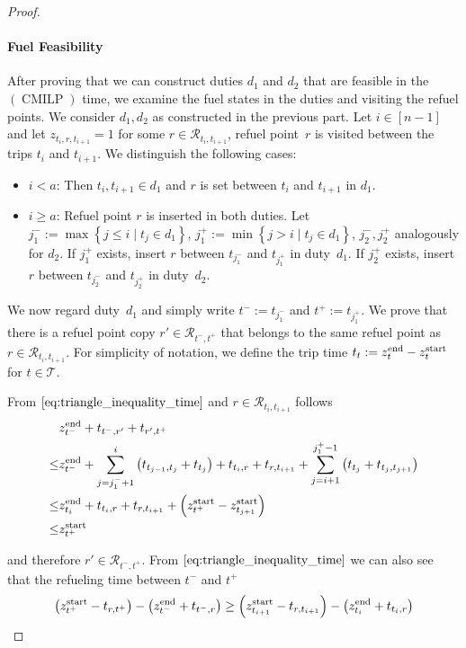 \begin{proof}
\paragraph{Fuel Feasibility} \proofparfill

After proving that we can construct duties $d_1$ and $d_2$ that are feasible in the $(\operatorname{CMILP})$ \wrt time, we examine the fuel states in the duties and visiting the refuel points. We consider $d_1,d_2$ as constructed in the previous part. Let $i\in[n-1]$ and let ${z_{t_i,r,t_{i+1}}=1}$ for some ${r\in\mathcal{R}_{t_i,t_{i+1}}}$, \ie refuel point~$r$ is visited between the trips $t_i$ and $t_{i+1}$. We distinguish the following cases:
\begin{itemize}
	\item{$i<a$:}
		Then ${t_i,t_{i+1}\in d_1}$ and $r$ is set between $t_i$ and $t_{i+1}$ in $d_1$.
	\item{$i\geq a$:}
		Refuel point $r$ is inserted in both duties. Let ${j^-_1:=\max\left\{j\leq i\mid t_j\in d_1\right\}}$, ${j^+_1:=\min\left\{j>i\mid t_j\in d_1\right\}}$, $j^-_2,j^+_2$ analogously for $d_2$. If $j^+_1$ exists, insert $r$ between $t_{j^-_1}$ and $t_{j^+_1}$ in duty~$d_1$. If $j^+_2$ exists, insert $r$ between $t_{j^-_2}$ and $t_{j^+_2}$ in duty~$d_2$.
\end{itemize}

We now regard duty~$d_1$ and simply write ${t^-:=t_{j^-_1}}$ and ${t^+:=t_{j^+_1}}$. We prove that there is a refuel point copy ${r'\in\mathcal{R}_{t^-,t^+}}$ that belongs to the same refuel point as ${r\in\mathcal{R}_{t_i,t_{i+1}}}$. For simplicity of notation, we define the trip time ${t_t := z^{\operatorname{end}}_{t} - z^{\operatorname{start}}_{t}}$ for ${t\in\mathcal{T}}$.

From $\eqref{eq:triangle_inequality_time}$ and ${r\in\mathcal{R}_{t_i,t_{i+1}}}$ follows
\begin{align*}
	& z^{\operatorname{end}}_{t^-} + t_{t^-,r'} + t_{r',t^+} \\
	\leq & z^{\operatorname{end}}_{t^-} + \sum_{j=j^-_1+1}^i \left(t_{t_{j-1},t_{j}} + t_{t_j}\right) + t_{t_i,r} + t_{r,t_{i+1}} + \sum_{j=i+1}^{j^+_1-1} \left(t_{t_j} + t_{t_{j},t_{j+1}}\right) \\
	\leq & z^{\operatorname{end}}_{t_i} + t_{t_i,r} + t_{r,t_{i+1}} + \left(z^{\operatorname{start}}_{t^+} - z^{\operatorname{start}}_{t_{j+1}}\right) \\
	\leq & z^{\operatorname{start}}_{t^+}
\end{align*}

and therefore ${r'\in\mathcal{R}_{t^-,t^+}}$. From $\eqref{eq:triangle_inequality_time}$ we can also see that the refueling time between $t^-$ and $t^+$
\begin{align*}
	\left(z^{\operatorname{start}}_{t^+} - t_{r,t^+}\right) - \left(z^{\operatorname{end}}_{t^-} + t_{t^-,r}\right) \geq \left(z^{\operatorname{start}}_{t_{i+1}} - t_{r,t_{i+1}}\right) - \left(z^{\operatorname{end}}_{t_i} + t_{t_i,r}\right)
\end{align*}


\end{proof}
